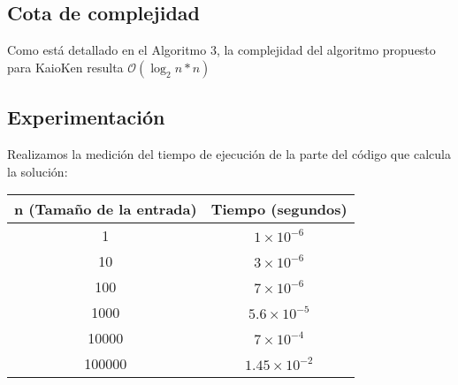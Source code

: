 \documentclass[10pt,a4paper]{article}
\begin{document}
\newpage
\subsection{Cota de complejidad}
\par{Como está detallado en el Algoritmo 3, la complejidad del algoritmo propuesto para KaioKen
resulta $\mathcal{O}(\log _{2} n * n)$}

\subsection{Experimentación}

Realizamos la medición del tiempo de ejecución de la parte del código que calcula la solución:
\begin{table}[h!]
\centering

\label{my-label}
\begin{tabular}{cc}
\hline
\multicolumn{1}{|c|}{n (Tamaño de la entrada)} & \multicolumn{1}{c|}{Tiempo (segundos)}                                                                                                                                    \\ \hline
\multicolumn{1}{|c|}{1}                        & \multicolumn{1}{c|}{$1 \times 10^{-6}$}                                                                                                                                     \\ \hline
\multicolumn{1}{|c|}{10}                       & \multicolumn{1}{c|}{$3 \times 10^{-6}$}                                                                                                                                     \\ \hline
\multicolumn{1}{|c|}{100}                      & \multicolumn{1}{c|}{$7 \times 10^{-6}$}                                                                                                                                     \\ \hline
\multicolumn{1}{|c|}{1000}                     & \multicolumn{1}{c|}{$5.6 \times 10^{-5}$}                                                                                                                                   \\ \hline
\multicolumn{1}{|c|}{10000}                    & \multicolumn{1}{c|}{$7 \times 10^{-4}$}                                                                                                                                  \\ \hline
\multicolumn{1}{|c|}{100000}                   & \multicolumn{1}{c|}{$1.45 \times 10^{-2}$}                                                                                                                                  \\ \hline

\end{tabular}
\end{table}
\end{document}
